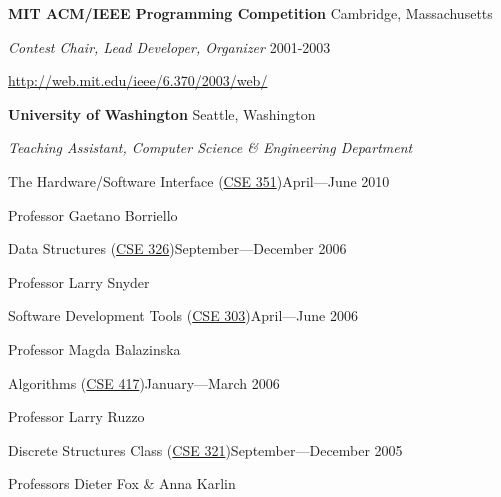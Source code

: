 \documentclass[letter]{article}
\begin{document}
{\bf MIT ACM/IEEE Programming Competition} \hfill Cambridge, Massachusetts

{\em Contest Chair, Lead Developer, Organizer} \hfill 2001-2003
\vspace{0.5\baselineskip}
\par

\url{http://web.mit.edu/ieee/6.370/2003/web/}

\vspace{\baselineskip}


{\bf University of Washington} \hfill Seattle, Washington

\par
{\em Teaching Assistant, Computer Science \& Engineering Department}

\vspace{0.5\baselineskip}
\par
The Hardware/Software Interface (\href{http://www.cs.washington.edu/education/courses/351/10sp/}{CSE 351})\hfill April---June 2010
\par
Professor Gaetano Borriello

\vspace{0.5\baselineskip}
\par
Data Structures (\href{http://www.cs.washington.edu/education/courses/326/06au/}{CSE 326})\hfill September---December 2006
\par
Professor Larry Snyder

\vspace{0.5\baselineskip}
\par
Software Development Tools (\href{http://www.cs.washington.edu/education/courses/303/06sp/}{CSE 303})\hfill April---June 2006
\par
Professor Magda Balazinska

\vspace{0.5\baselineskip}
\par
Algorithms (\href{http://www.cs.washington.edu/education/courses/417/06wi/}{CSE 417})\hfill January---March 2006
\par
Professor Larry Ruzzo

\vspace{0.5\baselineskip}
\par
Discrete Structures Class (\href{http://www.cs.washington.edu/education/courses/321/05au/}{CSE 321})\hfill September---December 2005
\par
Professors Dieter Fox \& Anna Karlin
\par
\end{document}
